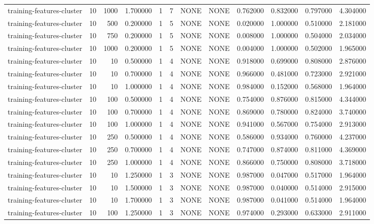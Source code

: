 \begin{tabular}{lrrrllllrrrr}
training-features-cluster & 10 & 1000 & 1.700000 & 1 & 7 & NONE & NONE & 0.762000 & 0.832000 & 0.797000 & 4.304000 \\
training-features-cluster & 10 & 500 & 0.200000 & 1 & 5 & NONE & NONE & 0.020000 & 1.000000 & 0.510000 & 2.181000 \\
training-features-cluster & 10 & 750 & 0.200000 & 1 & 5 & NONE & NONE & 0.008000 & 1.000000 & 0.504000 & 2.034000 \\
training-features-cluster & 10 & 1000 & 0.200000 & 1 & 5 & NONE & NONE & 0.004000 & 1.000000 & 0.502000 & 1.965000 \\
training-features-cluster & 10 & 10 & 0.500000 & 1 & 4 & NONE & NONE & 0.918000 & 0.699000 & 0.808000 & 2.876000 \\
training-features-cluster & 10 & 10 & 0.700000 & 1 & 4 & NONE & NONE & 0.966000 & 0.481000 & 0.723000 & 2.921000 \\
training-features-cluster & 10 & 10 & 1.000000 & 1 & 4 & NONE & NONE & 0.984000 & 0.152000 & 0.568000 & 1.964000 \\
training-features-cluster & 10 & 100 & 0.500000 & 1 & 4 & NONE & NONE & 0.754000 & 0.876000 & 0.815000 & 4.344000 \\
training-features-cluster & 10 & 100 & 0.700000 & 1 & 4 & NONE & NONE & 0.869000 & 0.780000 & 0.824000 & 3.740000 \\
training-features-cluster & 10 & 100 & 1.000000 & 1 & 4 & NONE & NONE & 0.941000 & 0.567000 & 0.754000 & 2.913000 \\
training-features-cluster & 10 & 250 & 0.500000 & 1 & 4 & NONE & NONE & 0.586000 & 0.934000 & 0.760000 & 4.237000 \\
training-features-cluster & 10 & 250 & 0.700000 & 1 & 4 & NONE & NONE & 0.747000 & 0.874000 & 0.811000 & 4.369000 \\
training-features-cluster & 10 & 250 & 1.000000 & 1 & 4 & NONE & NONE & 0.866000 & 0.750000 & 0.808000 & 3.718000 \\
training-features-cluster & 10 & 10 & 1.250000 & 1 & 3 & NONE & NONE & 0.987000 & 0.047000 & 0.517000 & 1.964000 \\
training-features-cluster & 10 & 10 & 1.500000 & 1 & 3 & NONE & NONE & 0.987000 & 0.040000 & 0.514000 & 2.915000 \\
training-features-cluster & 10 & 10 & 1.700000 & 1 & 3 & NONE & NONE & 0.987000 & 0.041000 & 0.514000 & 1.964000 \\
training-features-cluster & 10 & 100 & 1.250000 & 1 & 3 & NONE & NONE & 0.974000 & 0.293000 & 0.633000 & 2.911000 \\

\end{tabular}

